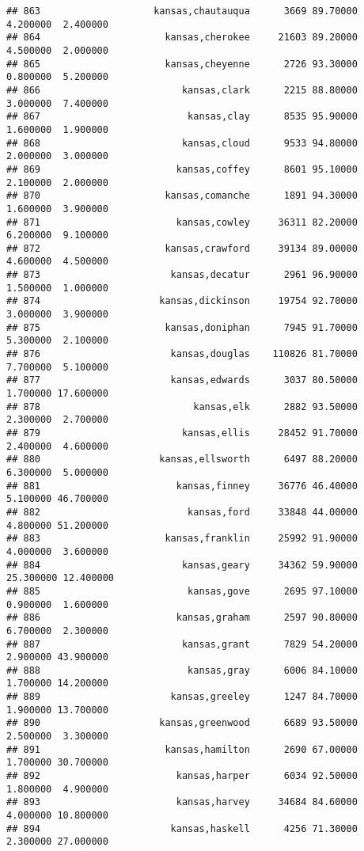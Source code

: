 \documentclass[
]{article}
\begin{document}
\begin{verbatim}
## 863                    kansas,chautauqua      3669 89.70000  4.200000  2.400000
## 864                      kansas,cherokee     21603 89.20000  4.500000  2.000000
## 865                      kansas,cheyenne      2726 93.30000  0.800000  5.200000
## 866                         kansas,clark      2215 88.80000  3.000000  7.400000
## 867                          kansas,clay      8535 95.90000  1.600000  1.900000
## 868                         kansas,cloud      9533 94.80000  2.000000  3.000000
## 869                        kansas,coffey      8601 95.10000  2.100000  2.000000
## 870                      kansas,comanche      1891 94.30000  1.600000  3.900000
## 871                        kansas,cowley     36311 82.20000  6.200000  9.100000
## 872                      kansas,crawford     39134 89.00000  4.600000  4.500000
## 873                       kansas,decatur      2961 96.90000  1.500000  1.000000
## 874                     kansas,dickinson     19754 92.70000  3.000000  3.900000
## 875                      kansas,doniphan      7945 91.70000  5.300000  2.100000
## 876                       kansas,douglas    110826 81.70000  7.700000  5.100000
## 877                       kansas,edwards      3037 80.50000  1.700000 17.600000
## 878                           kansas,elk      2882 93.50000  2.300000  2.700000
## 879                         kansas,ellis     28452 91.70000  2.400000  4.600000
## 880                     kansas,ellsworth      6497 88.20000  6.300000  5.000000
## 881                        kansas,finney     36776 46.40000  5.100000 46.700000
## 882                          kansas,ford     33848 44.00000  4.800000 51.200000
## 883                      kansas,franklin     25992 91.90000  4.000000  3.600000
## 884                         kansas,geary     34362 59.90000 25.300000 12.400000
## 885                          kansas,gove      2695 97.10000  0.900000  1.600000
## 886                        kansas,graham      2597 90.80000  6.700000  2.300000
## 887                         kansas,grant      7829 54.20000  2.900000 43.900000
## 888                          kansas,gray      6006 84.10000  1.700000 14.200000
## 889                       kansas,greeley      1247 84.70000  1.900000 13.700000
## 890                     kansas,greenwood      6689 93.50000  2.500000  3.300000
## 891                      kansas,hamilton      2690 67.00000  1.700000 30.700000
## 892                        kansas,harper      6034 92.50000  1.800000  4.900000
## 893                        kansas,harvey     34684 84.60000  4.000000 10.800000
## 894                       kansas,haskell      4256 71.30000  2.300000 27.000000

\end{verbatim}
\end{document}
